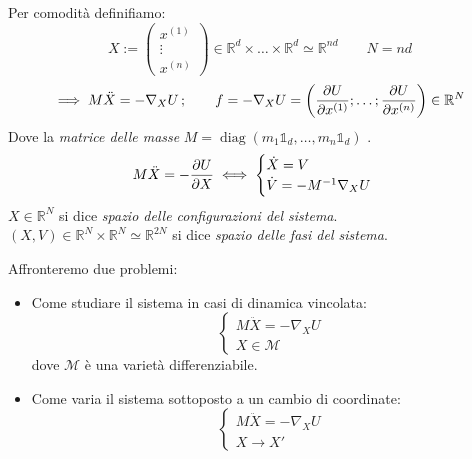 Per comodità definifiamo:
\begin{equation}
    X:=\begin{pmatrix}
        x^{(1)}\\\vdots\\x^{(n )}
    \end{pmatrix}
    \in \mathbb{R}^d \times \dots \times \mathbb{R}^d \simeq \mathbb{R}^{nd}\qquad N = nd
\end{equation}
\begin{equation}
    \implies M\ddot{X}= -\nabla_X U\,; \qquad f = -\nabla_X U = \left( \pdv{U}{x^{(1)}};\dots;\pdv{U}{x^{(n)}} \right)\in \mathbb{R}^N 
\end{equation}
Dove la \textit{matrice delle masse }$M = \operatorname{diag} (m_1 \mathds{1}_d, \dots, m_n\mathds{1}_d)$ .
\begin{equation}
     M\ddot{X}= -\pdv{U}{X}\iff
    \begin{cases}
        \dot{X}= V\\\dot{V}= - M^{-1}\nabla_X U
    \end{cases}
\end{equation}
$X \in \mathbb{R}^N$ si dice \textit{spazio delle configurazioni del sistema}.\\
$(X,V)\in \mathbb{R}^N \times \mathbb{R}^N \simeq \mathbb{R}^{2N}$ si dice \textit{spazio delle fasi del sistema}.

\begin{samepage}
Affronteremo due problemi:
\begin{itemize}
    \item Come studiare il sistema in casi di dinamica vincolata:\begin{equation*}
        \begin{cases}
            M\ddot{X}= -\nabla_X U\\ X \in \mathcal{M}
        \end{cases}
        \end{equation*}
        dove $\mathcal{M}$ è una varietà differenziabile.
    \item Come varia il sistema sottoposto a un cambio di coordinate:\begin{equation*}
        \begin{cases}
            M\ddot{X} = -\nabla_X U\\ X \rightarrow X'
        \end{cases}
    \end{equation*}
\end{itemize}
\end{samepage}

